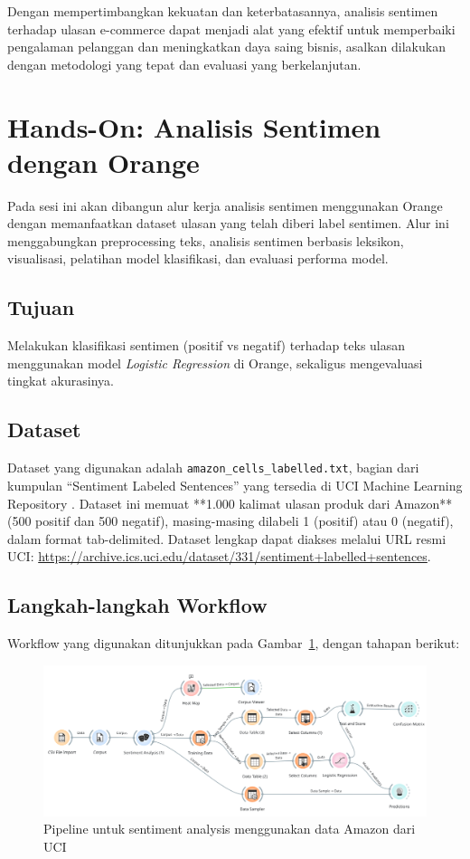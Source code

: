 Dengan mempertimbangkan kekuatan dan keterbatasannya, analisis sentimen terhadap ulasan e-commerce dapat menjadi alat yang efektif untuk memperbaiki pengalaman pelanggan dan meningkatkan daya saing bisnis, asalkan dilakukan dengan metodologi yang tepat dan evaluasi yang berkelanjutan.



\section{Hands-On: Analisis Sentimen dengan Orange}

Pada sesi ini akan dibangun alur kerja analisis sentimen menggunakan Orange dengan memanfaatkan dataset ulasan yang telah diberi label sentimen. Alur ini menggabungkan preprocessing teks, analisis sentimen berbasis leksikon, visualisasi, pelatihan model klasifikasi, dan evaluasi performa model.

\subsection*{Tujuan}
Melakukan klasifikasi sentimen (positif vs negatif) terhadap teks ulasan menggunakan model \textit{Logistic Regression} di Orange, sekaligus mengevaluasi tingkat akurasinya.

\subsection*{Dataset}
Dataset yang digunakan adalah \texttt{amazon\_cells\_labelled.txt}, bagian dari kumpulan “Sentiment Labeled Sentences” yang tersedia di UCI Machine Learning Repository \cite{kotzias2015sentiment}.  
Dataset ini memuat **1.000 kalimat ulasan produk dari Amazon** (500 positif dan 500 negatif), masing-masing dilabeli 1 (positif) atau 0 (negatif), dalam format tab-delimited.  
Dataset lengkap dapat diakses melalui URL resmi UCI:  
\url{https://archive.ics.uci.edu/dataset/331/sentiment+labelled+sentences}.

\subsection*{Langkah-langkah Workflow}
Workflow yang digunakan ditunjukkan pada Gambar~\ref{fig:sentiment-pipeline}, dengan tahapan berikut:

\begin{figure}[h]
	\centering
	\includegraphics[width=\linewidth]{../figures/sentiment_pipeline.png}
	\caption{Pipeline untuk sentiment analysis menggunakan data Amazon dari UCI}
	\label{fig:sentiment-pipeline}
\end{figure}

